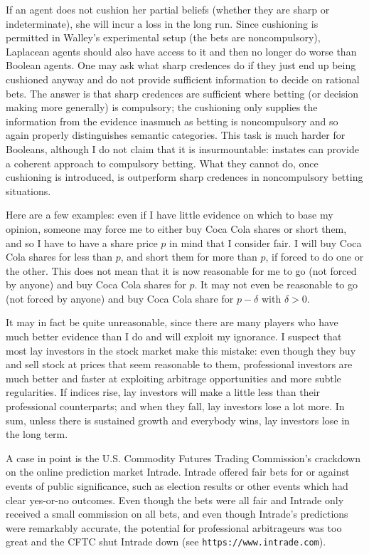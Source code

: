 \documentclass[journal]{IEEEtran}
\begin{document}
If an agent does not cushion her partial beliefs (whether they are
sharp or indeterminate), she will incur a loss in the long run. Since
cushioning is permitted in Walley's experimental setup (the bets are
noncompulsory), Laplacean agents should also have access to it and
then no longer do worse than Boolean agents. One may ask what sharp
credences do if they just end up being cushioned anyway and do not
provide sufficient information to decide on rational bets. The answer
is that sharp credences are sufficient where betting (or decision
making more generally) is compulsory; the cushioning only supplies the
information from the evidence inasmuch as betting is noncompulsory and
so again properly distinguishes semantic categories. This task is much
harder for Booleans, although I do not claim that it is
insurmountable: instates can provide a coherent approach to compulsory
betting. What they cannot do, once cushioning is introduced, is
outperform sharp credences in noncompulsory betting situations.

Here are a few examples: even if I have little evidence on which to
base my opinion, someone may force me to either buy Coca Cola shares
or short them, and so I have to have a share price $p$ in mind that I
consider fair. I will buy Coca Cola shares for less than $p$, and
short them for more than $p$, if forced to do one or the other. This
does not mean that it is now reasonable for me to go (not forced by
anyone) and buy Coca Cola shares for $p$. It may not even be
reasonable to go (not forced by anyone) and buy Coca Cola share for
$p-\delta$ with $\delta{}>0$.

It may in fact be quite unreasonable, since there are many players who
have much better evidence than I do and will exploit my ignorance. I
suspect that most lay investors in the stock market make this mistake:
even though they buy and sell stock at prices that seem reasonable to
them, professional investors are much better and faster at exploiting
arbitrage opportunities and more subtle regularities. If indices rise,
lay investors will make a little less than their professional
counterparts; and when they fall, lay investors lose a lot more. In
sum, unless there is sustained growth and everybody wins, lay
investors lose in the long term.

A case in point is the U.S. Commodity Futures Trading Commission's
crackdown on the online prediction market Intrade. Intrade offered
fair bets for or against events of public significance, such as
election results or other events which had clear yes-or-no outcomes.
Even though the bets were all fair and Intrade only received a small
commission on all bets, and even though Intrade's predictions were
remarkably accurate, the potential for professional arbitrageurs was
too great and the CFTC shut Intrade down (see
\texttt{https://www.intrade.com}).
\end{document}
